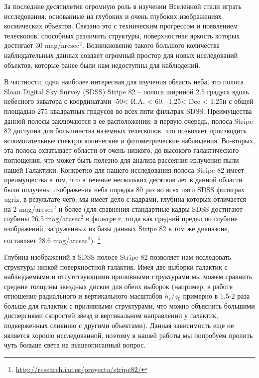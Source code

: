 За последние десятилетия огромную роль в изучении Вселенной стали играть исследования, основанные на глубоких и очень глубоких изображениях космических объектов. Связано это с техническим прогрессом и появлением телескопов, способных различить структуры, поверхностная яркость которых достигает 30 mag/arcsec$^2$. Возникновение такого большого количества наблюдательных данных создает огромный простор для новых исследований объектов, которые ранее были нам недоступны для наблюдений. 

В частности, одна наиболее интересная для изучения область неба, это полоса Sloan Digital Sky Survey (SDSS) Stripe 82 – полоса шириной 2.5 градуса вдоль небесного экватора с координатами -50\degree < R.A. < 60\degree, -1.25\degree< Dec < 1.25\degree и  с общей площадью 275 квадратных градусов во всех пяти фильтрах SDSS. Преимущества данной полосы заключаются в ее расположении: в первую очередь,  полоса Stripe 82 доступна для большинства наземных телескопов, что позволяет производить вспомогательные спектроскопические и фотометрические наблюдения. Во-вторых, эта полоса охватывает области от очень низкого, до высокого галактического поглощения, что может быть полезно для анализа рассеяния излучения пыли нашей Галактики. Конкретно для нашего исследования полоса Stripe 82 имеет преимущества в том, что в течение нескольких десятков лет в данной области были получены изображения неба порядка 80 раз во всех пяти SDSS фильтрах ugriz, в результате чего, мы имеет дело с кадрами, глубина которых отличается на 2 mag/arcsec$^2$ и более (для сравнения стандартные кадры SDSS достигают глубины 26.5 mag/arcsec$^2$ в фильтре r, тогда как средний предел по глубине изображений, загруженных из базы данных Stripe 82 в том же диапазоне, составляет 28.6 mag/arcsec$^2$). \footnote{\url{http://research.iac.es/proyecto/stripe82/}}

Глубина изображений в SDSS полосе Stripe 82 позволяет нам исследовать структуры низкой поверхностной галактик. Имея две выборки галактик с наблюдаемыми и отсутствующими приливными структурами мы можем сравнить средние толщины звездных дисков для обеих выборок (например, в работе \cite{1997A&A...324...80R} отношение радиального и вертикального масштабов $h_r/z_0$ примерно в 1.5-2 раза больше для галактик с приливными структурами, что можно объяснить большими дисперсиями скоростей звезд в вертикальном направлении у галактик, подверженных слиянию с другими объектами). Данная зависимость еще не является хорошо исследованной, поэтому в нашей работы мы попробуем пролить чуть больше света на вышеописанный вопрос.

